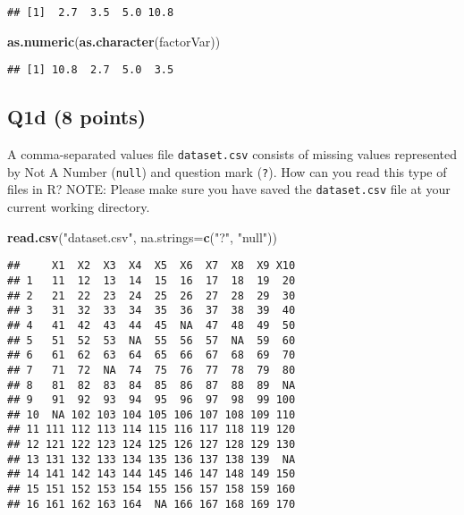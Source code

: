 \documentclass[
]{article}
\newenvironment{Shaded}{\begin{snugshade}}{\end{snugshade}}
\newcommand{\AttributeTok}[1]{\textcolor[rgb]{0.13,0.29,0.53}{#1}}
\newcommand{\FunctionTok}[1]{\textcolor[rgb]{0.13,0.29,0.53}{\textbf{#1}}}
\newcommand{\NormalTok}[1]{#1}
\newcommand{\StringTok}[1]{\textcolor[rgb]{0.31,0.60,0.02}{#1}}
\begin{document}
\begin{verbatim}
## [1]  2.7  3.5  5.0 10.8
\end{verbatim}

\begin{Shaded}
\begin{Highlighting}[]
\FunctionTok{as.numeric}\NormalTok{(}\FunctionTok{as.character}\NormalTok{(factorVar))}
\end{Highlighting}
\end{Shaded}

\begin{verbatim}
## [1] 10.8  2.7  5.0  3.5
\end{verbatim}

\hypertarget{q1d-8-points}{%
\subsection{Q1d (8 points)}\label{q1d-8-points}}

A comma-separated values file \texttt{dataset.csv} consists of missing
values represented by Not A Number (\texttt{null}) and question mark
(\texttt{?}). How can you read this type of files in R? NOTE: Please
make sure you have saved the \texttt{dataset.csv} file at your current
working directory.

\begin{Shaded}
\begin{Highlighting}[]
\FunctionTok{read.csv}\NormalTok{(}\StringTok{"dataset.csv"}\NormalTok{, }\AttributeTok{na.strings=}\FunctionTok{c}\NormalTok{(}\StringTok{"?"}\NormalTok{, }\StringTok{"null"}\NormalTok{))}
\end{Highlighting}
\end{Shaded}

\begin{verbatim}
##     X1  X2  X3  X4  X5  X6  X7  X8  X9 X10
## 1   11  12  13  14  15  16  17  18  19  20
## 2   21  22  23  24  25  26  27  28  29  30
## 3   31  32  33  34  35  36  37  38  39  40
## 4   41  42  43  44  45  NA  47  48  49  50
## 5   51  52  53  NA  55  56  57  NA  59  60
## 6   61  62  63  64  65  66  67  68  69  70
## 7   71  72  NA  74  75  76  77  78  79  80
## 8   81  82  83  84  85  86  87  88  89  NA
## 9   91  92  93  94  95  96  97  98  99 100
## 10  NA 102 103 104 105 106 107 108 109 110
## 11 111 112 113 114 115 116 117 118 119 120
## 12 121 122 123 124 125 126 127 128 129 130
## 13 131 132 133 134 135 136 137 138 139  NA
## 14 141 142 143 144 145 146 147 148 149 150
## 15 151 152 153 154 155 156 157 158 159 160
## 16 161 162 163 164  NA 166 167 168 169 170
\end{verbatim}
\end{document}
